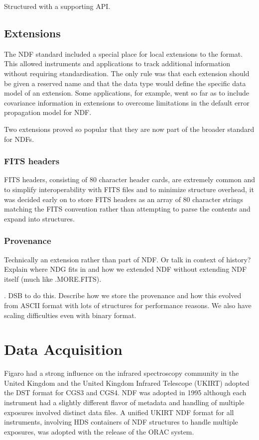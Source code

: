 \documentclass[final,authoryear,5p,times,twocolumn]{elsarticle}
\begin{document}
{{\color{red} Structured with a supporting API.}

\subsection{Extensions}

The NDF standard included a special place for local extensions to the
format. This allowed instruments and applications to track additional
information without requiring standardisation. The only rule was that
each extension should be given a reserved name and that the data type
would define the specific data model of an extension. Some
applications, for example, went so far as to include covariance
information in extensions to overcome limitations in the default error
propagation model for NDF.

Two extensions proved so popular that they are now part of the broader
standard for NDFs.

\subsubsection{FITS headers}

FITS headers, consisting of 80 character header cards, are extremely
common and to simplify interoperability with FITS files and to
minimize structure overhead, it was decided early on to store FITS
headers as an array of 80 character strings matching the FITS
convention rather than attempting to parse the contents and expand
into structures.

\subsubsection{Provenance}

{\color{red} Technically an extension rather than part of NDF. Or talk
  in context of history? Explain where NDG fits in and how we extended
  NDF without extending NDF itself (much like .MORE.FITS).}

{\color{red}. DSB to do this. Describe how we store the provenance and
  how this evolved from ASCII format with lots of structures for
  performance reasons. We also have scaling difficulties even with
  binary format.}

\section{Data Acquisition}

Figaro had a strong influence on the infrared spectroscopy community
in the United Kingdom and the United Kingdom Infrared Telescope
(UKIRT) adopted the DST format for CGS3 and CGS4. NDF was adopted in
1995 although each instrument had a slightly different flavor of
metadata and handling of multiple exposures involved distinct data
files. A unified UKIRT NDF format for all instruments, involving HDS
containers of NDF structures to handle multiple exposures, was
adopted with the release of the ORAC system.

}
\end{document}
